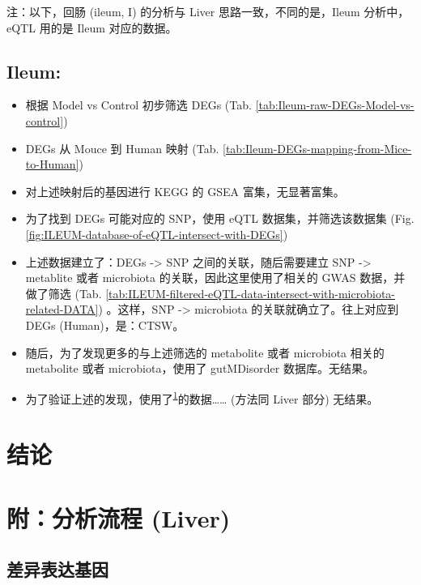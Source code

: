 \documentclass[
]{article}
\providecommand{\tightlist}{%
  \setlength{\itemsep}{0pt}\setlength{\parskip}{0pt}}
\begin{document}
注：以下，回肠 (ileum, I) 的分析与 Liver 思路一致，不同的是，Ileum 分析中，eQTL 用的是 Ileum 对应的数据。

\hypertarget{ileum}{%
\subsection{Ileum:}\label{ileum}}

\begin{itemize}
\tightlist
\item
  根据 Model vs Control 初步筛选 DEGs (Tab. \ref{tab:Ileum-raw-DEGs-Model-vs-control})
\item
  DEGs 从 Mouce 到 Human 映射 (Tab. \ref{tab:Ileum-DEGs-mapping-from-Mice-to-Human})
\item
  对上述映射后的基因进行 KEGG 的 GSEA 富集，无显著富集。
\item
  为了找到 DEGs 可能对应的 SNP，使用 eQTL 数据集，并筛选该数据集 (Fig. \ref{fig:ILEUM-database-of-eQTL-intersect-with-DEGs})\\
\item
  上述数据建立了：DEGs -\textgreater{} SNP 之间的关联，随后需要建立 SNP -\textgreater{} metablite 或者 microbiota 的关联，因此这里使用了相关的 GWAS 数据，并做了筛选 (Tab. \ref{tab:ILEUM-filtered-eQTL-data-intersect-with-microbiota-related-DATA}) 。这样，SNP -\textgreater{} microbiota 的关联就确立了。往上对应到 DEGs (Human)，是：CTSW。
\item
  随后，为了发现更多的与上述筛选的 metabolite 或者 microbiota 相关的 metabolite 或者 microbiota，使用了 gutMDisorder 数据库。无结果。
\item
  为了验证上述的发现，使用了\textsuperscript{\protect\hyperlink{ref-ChangesAndCorChen2021}{1}}的数据\ldots\ldots{} (方法同 Liver 部分) 无结果。
\end{itemize}

\hypertarget{dis}{%
\section{结论}\label{dis}}

\hypertarget{workflow}{%
\section{附：分析流程 (Liver)}\label{workflow}}

\hypertarget{ux5deeux5f02ux8868ux8fbeux57faux56e0}{%
\subsection{差异表达基因}\label{ux5deeux5f02ux8868ux8fbeux57faux56e0}}
\end{document}
